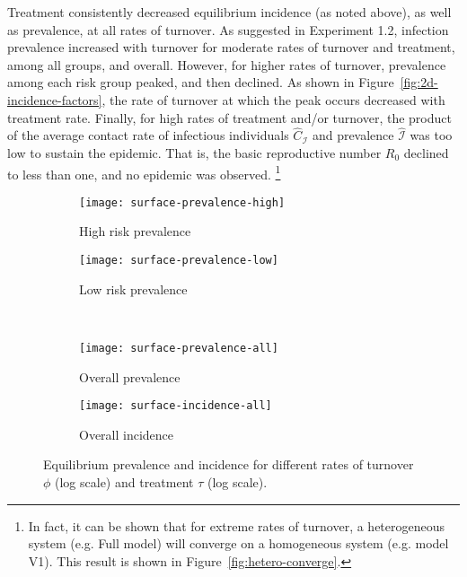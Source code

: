 Treatment consistently decreased equilibrium incidence (as noted above),
as well as prevalence, at all rates of turnover.
As suggested in Experiment 1.2, infection prevalence increased with turnover
for moderate rates of turnover and treatment, among all groups, and overall.
However, for higher rates of turnover,
prevalence among each risk group peaked, and then declined.
As shown in Figure~\ref{fig:2d-incidence-factors},
the rate of turnover at which the peak occurs decreased with treatment rate.
Finally, for high rates of treatment and/or turnover, the product of
the average contact rate of infectious individuals $\hat{C}_\mathcal{I}$
and prevalence $\hat{\mathcal{I}}$
was too low to sustain the epidemic.
That is, the basic reproductive number $R_0$ declined to less than one,
and no epidemic was  observed.%
\footnote{In fact, it can be shown that for extreme rates of turnover,
  a heterogeneous system (e.g. Full model) will converge on
  a homogeneous system (e.g. model V1).
  This result is shown in Figure~\ref{fig:hetero-converge}.}
\begin{figure}[!tbp]
  \centering
  \begin{subfigure}{0.45\linewidth}
    \centering
    \texttt{[image: surface-prevalence-high]}
    \caption{High risk prevalence}
    \label{fig:surface-prevalence-high}
  \end{subfigure}
  \begin{subfigure}{0.45\linewidth}
    \centering
    \texttt{[image: surface-prevalence-low]}
    \caption{Low risk prevalence}
    \label{fig:surface-prevalence-low}
  \end{subfigure}\\[1em]
  \begin{subfigure}{0.45\linewidth}
    \centering
    \texttt{[image: surface-prevalence-all]}
    \caption{Overall prevalence}
    \label{fig:surface-prevalence-all}
  \end{subfigure}
  \begin{subfigure}{0.45\linewidth}
    \centering
    \texttt{[image: surface-incidence-all]}
    \caption{Overall incidence}
    \label{fig:surface-incidence-all}
  \end{subfigure}
  \caption{Equilibrium prevalence and incidence for different rates of
    turnover $\phi$ (log scale) and
    treatment $\tau$ (log scale).}
  \label{fig:surface}
\end{figure}
